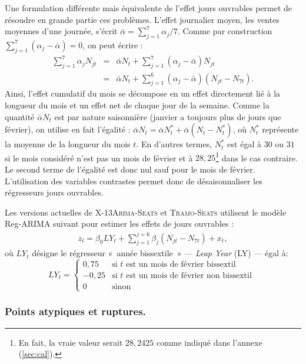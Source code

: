 \documentclass[12pt, a4paper, french]{article}
\begin{document}
Une formulation différente mais équivalente de l'effet jours ouvrables permet de résoudre en grande partie ces problèmes. L'effet journalier moyen, les ventes moyennes d'une journée, s'écrit $\bar{\alpha} = \sum_{j=1}^7 \alpha_j /7$. 
Comme par construction $\sum_{j=1}^7 \left(\alpha_j-\bar{\alpha}\right) = 0$, on peut écrire :
\begin{eqnarray*}
\sum_{j=1}^7 \alpha_j N_{jt} & = & \bar{\alpha}N_t + \sum_{j=1}^7 \left(\alpha_j-\bar{\alpha}\right) N_{jt} \nonumber \\
& = &  \bar{\alpha}N_t + \sum_{j=1}^6 \left(\alpha_j-\bar{\alpha}\right) \left(N_{jt} - N_{7t}\right).
\end{eqnarray*}
Ainsi, l'effet cumulatif du mois se décompose en un effet directement lié à la longueur du mois et un effet net de chaque jour de la semaine. Comme la quantité $\bar{\alpha}N_t$ est par nature saisonnière (janvier a toujours plus de jours que février), on utilise en fait l'égalité : $\bar{\alpha}N_t = \bar{\alpha}N_t^* + \bar{\alpha}\left(N_t-N_t^*\right)$, où $N_t^*$
représente la moyenne de la longueur du mois $t$. En d'autres termes, $N_t^*$  est égal à $30$ ou $31$ si le mois considéré n'est pas un mois de février et à $28,25$\footnote{En fait, la vraie valeur serait $28,2425$ comme indiqué dans l'annexe (\ref{sec:cal}).} dans le cas contraire. Le second terme de l'égalité est donc nul sauf pour le mois de février. L'utilisation des variables contrastes permet donc de désaisonnaliser les régresseurs jours ouvrables.

Les versions actuelles de \textsc{X-13Arima-Seats} et \textsc{Tramo-Seats} utilisent le modèle Reg-ARIMA suivant pour estimer les effets de jours ouvrables :
\begin{eqnarray}
	\label{eq:eq3}
z_t=\beta_0 LY_t + \sum_{j=1}^{j=6} \beta_j \left(N_{jt} - N_{7t}\right) + x_t,
\end{eqnarray}
où $LY_t$ désigne le régresseur «~année bissextile~» --- \emph{Leap Year} (LY) --- égal à:
\[
LY_{t} = \left\{ \begin{array}{rl} 
                0,75 & \mbox{si } t \mbox{ est un mois de février bissextil } \\
                -0,25 & \mbox{si } t \mbox{ est un mois de février non bissextil } \\
                0 & \mbox{sinon}
               \end{array}
         \right.
\]


\subsubsection{Points atypiques et ruptures.}
\label{sec:PAR}
\end{document}
